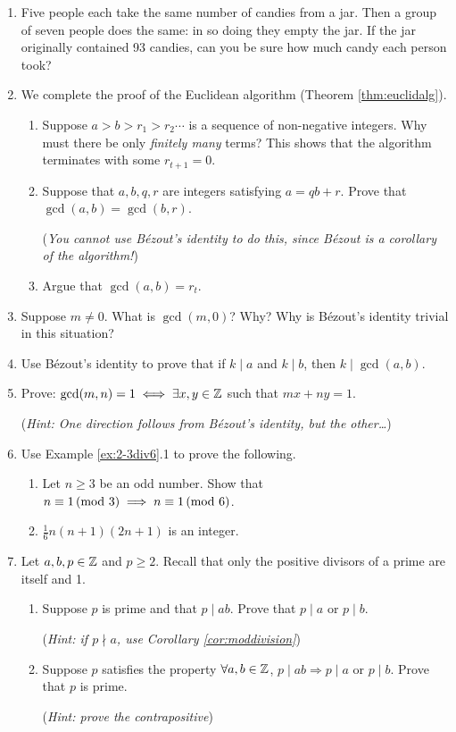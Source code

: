 \begin{exercises}{}{}
\begin{enumerate}
	  \item Five people each take the same number of candies from a jar. Then a group of seven people does the same: in so doing they empty the jar. If the jar originally contained 93 candies, can you be sure how much candy each person took?
	
	
	  \item\label{exs:euclidalgproof} We complete the proof of the Euclidean algorithm (Theorem \ref{thm:euclidalg}).
	  \begin{enumerate}
	    \item Suppose $a>b>r_1>r_2\cdots$ is a sequence of non-negative integers. Why must there be only \emph{finitely many} terms? This shows that the algorithm terminates with some $r_{t+1}=0$.
	    \item Suppose that $a,b,q,r$ are integers satisfying $a=qb+r$. Prove that $\gcd(a,b)=\gcd(b,r)$.\par
	    (\emph{You cannot use Bézout's identity to do this, since Bézout is a corollary of the algorithm!})
	    \item Argue that $\gcd(a,b)=r_t$.
	  \end{enumerate}
	  
	
		\item\label{exs:gcd0} Suppose $m\neq 0$. What is $\gcd(m,0)$? Why? Why is Bézout's identity trivial in this situation?
			
	  
	  \item Use Bézout's identity to prove that if $k\mid a$ and $k\mid b$, then $k\mid\gcd(a,b)$.
	  
	
	  \item\label{ex:gcd1} Prove: $\gcd(m,n)=1\iff\exists x,y\in\mathbb{Z}$ such that $mx+ny=1$.\par
	  (\emph{Hint: One direction follows from Bézout's identity, but the other\ldots})
	    
	    
		\item Use Example \ref{ex:2-3div6}.1 to prove the following.
		\begin{enumerate}
		  \item Let $n\ge 3$ be an odd number. Show that $n\equiv 1\negthickspace\pmod{3}\implies  n\equiv 1\negthickspace\pmod{6}$.
		 	\item $\frac 16n(n+1)(2n+1)$ is an integer.
		\end{enumerate}
	  
	  
		\item\label{exs:primedef1} Let $a,b,p\in\mathbb{Z}$ and $p\ge 2$. Recall that only the positive divisors of a prime are itself and 1.
	  \begin{enumerate}
	    \item Suppose $p$ is prime and that $p\mid ab$. Prove that $p\mid a$ or $p\mid b$.\par
	    (\emph{Hint: if $p\nmid a$, use Corollary \ref{cor:moddivision}})
	    \item Suppose $p$ satisfies the property $\forall a,b\in\mathbb{Z}$, $p\mid ab\Longrightarrow p\mid a$ or $p\mid b$. Prove that $p$ is prime.\par
	    (\emph{Hint: prove the contrapositive})
	  \end{enumerate}
	    

\end{enumerate}
\end{exercises}
